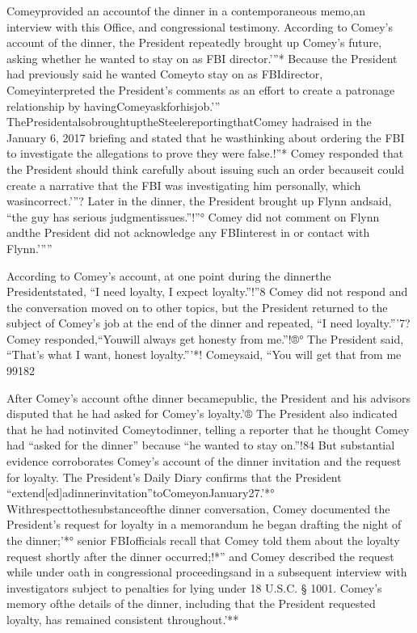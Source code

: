 Comeyprovided an accountof the dinner in a contemporaneous memo,an interview with this Office, and congressional testimony. According to Comey’s account of the dinner, the President repeatedly brought up Comey’s future, asking whether he wanted to stay on as FBI director.'”* Because the President had previously said he wanted Comeyto stay on as FBIdirector, Comeyinterpreted the President’s comments as an effort to create a patronage relationship by havingComeyaskforhisjob.'” ThePresidentalsobroughtuptheSteelereportingthatComey hadraised in the January 6, 2017 briefing and stated that he wasthinking about ordering the FBI to investigate the allegations to prove they were false.!”* Comey responded that the President should think carefully about issuing such an order becauseit could create a narrative that the FBI was investigating him personally, which wasincorrect.'”? Later in the dinner, the President brought up Flynn andsaid, “the guy has serious judgmentissues.”!”° Comey did not comment on Flynn andthe President did not acknowledge any FBIinterest in or contact with Flynn.'””

According to Comey’s account, at one point during the dinnerthe Presidentstated, “I need loyalty, I expect loyalty.”!”8 Comey did not respond and the conversation moved on to other topics, but the President returned to the subject of Comey’s job at the end of the dinner and repeated, “I need loyalty.”'7? Comey responded,“Youwill always get honesty from me.”!®° The President said, “That’s what I want, honest loyalty.”'*! Comeysaid, “You will get that from me 99182

After Comey’s account ofthe dinner becamepublic, the President and his advisors disputed that he had asked for Comey’s loyalty.'® The President also indicated that he had notinvited Comeytodinner, telling a reporter that he thought Comey had “asked for the dinner” because “he wanted to stay on.”!84 But substantial evidence corroborates Comey’s account of the dinner invitation and the request for loyalty. The President’s Daily Diary confirms that the President “extend[ed]adinnerinvitation”toComeyonJanuary27.'*° Withrespecttothesubstanceofthe dinner conversation, Comey documented the President’s request for loyalty in a memorandum he began drafting the night of the dinner;'*° senior FBIofficials recall that Comey told them about the loyalty request shortly after the dinner occurred;!*” and Comey described the request while under oath in congressional proceedingsand in a subsequent interview with investigators subject to penalties for lying under 18 U.S.C. § 1001. Comey’s memory ofthe details of the dinner, including that the President requested loyalty, has remained consistent throughout.'**

